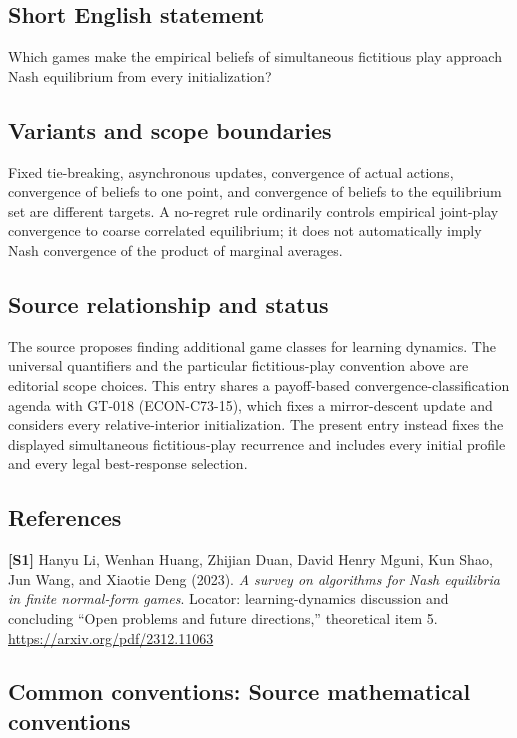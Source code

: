 \documentclass[11pt,a4paper]{article}
\begin{document}
\subsection*{Short English statement}
Which games make the empirical beliefs of simultaneous fictitious play approach Nash equilibrium from every initialization?
\subsection*{Variants and scope boundaries}
Fixed tie-breaking, asynchronous updates, convergence of actual actions, convergence of beliefs to one point, and convergence of beliefs to the equilibrium set are different targets. A no-regret rule ordinarily controls empirical joint-play convergence to coarse correlated equilibrium; it does not automatically imply Nash convergence of the product of marginal averages.
\subsection*{Source relationship and status}
The source proposes finding additional game classes for learning dynamics. The universal quantifiers and the particular fictitious-play convention above are editorial scope choices. This entry shares a payoff-based convergence-classification agenda with
GT-018 (ECON-C73-15), which fixes a mirror-descent update and considers
every relative-interior initialization. The present entry instead fixes
the displayed simultaneous fictitious-play recurrence and includes every
initial profile and every legal best-response selection.
\subsection*{References}
\begingroup\footnotesize\raggedright
{\footnotesize\raggedright
\textbf{[S1]} Hanyu Li, Wenhan Huang, Zhijian Duan, David Henry Mguni, Kun Shao, Jun Wang, and Xiaotie Deng (2023). \emph{A survey on algorithms for Nash equilibria in finite normal-form games}. Locator: learning-dynamics discussion and concluding ``Open problems and future directions,'' theoretical item 5. \url{https://arxiv.org/pdf/2312.11063}\par}
\par\endgroup

\subsection*{Common conventions: Source mathematical conventions}
\end{document}
